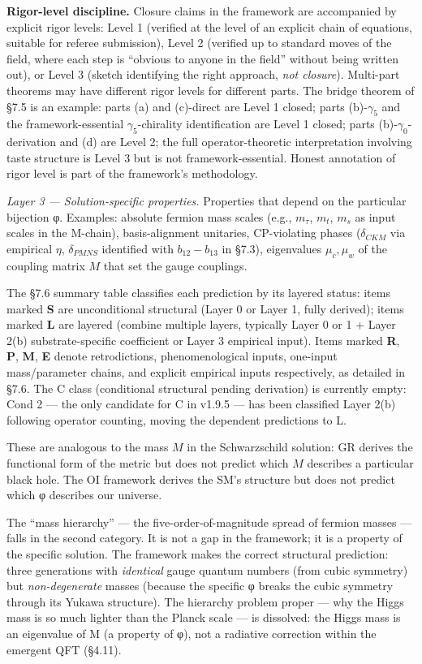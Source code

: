 \documentclass[
]{article}
\begin{document}
\textbf{Rigor-level discipline.} Closure claims in the framework are
accompanied by explicit rigor levels: Level 1 (verified at the level of
an explicit chain of equations, suitable for referee submission), Level
2 (verified up to standard moves of the field, where each step is
``obvious to anyone in the field'' without being written out), or Level
3 (sketch identifying the right approach, \emph{not closure}).
Multi-part theorems may have different rigor levels for different parts.
The bridge theorem of §7.5 is an example: parts (a) and (c)-direct are
Level 1 closed; parts (b)-\(\gamma_5\) and the framework-essential
\(\gamma_5\)-chirality identification are Level 1 closed; parts
(b)-\(\gamma_0\)-derivation and (d) are Level 2; the full
operator-theoretic interpretation involving taste structure is Level 3
but is not framework-essential. Honest annotation of rigor level is part
of the framework's methodology.

\emph{Layer 3 --- Solution-specific properties.} Properties that depend
on the particular bijection φ. Examples: absolute fermion mass scales
(e.g., \(m_\tau\), \(m_t\), \(m_s\) as input scales in the M-chain),
basis-alignment unitaries, CP-violating phases (\(\delta_{CKM}\) via
empirical \(\eta\), \(\delta_{PMNS}\) identified with
\(b_{12} - b_{13}\) in §7.3), eigenvalues \(\mu_c, \mu_w\) of the
coupling matrix \(M\) that set the gauge couplings.

The §7.6 summary table classifies each prediction by its layered status:
items marked \textbf{S} are unconditional structural (Layer 0 or Layer
1, fully derived); items marked \textbf{L} are layered (combine multiple
layers, typically Layer 0 or 1 + Layer 2(b) substrate-specific
coefficient or Layer 3 empirical input). Items marked \textbf{R},
\textbf{P}, \textbf{M}, \textbf{E} denote retrodictions,
phenomenological inputs, one-input mass/parameter chains, and explicit
empirical inputs respectively, as detailed in §7.6. The C class
(conditional structural pending derivation) is currently empty: Cond 2
--- the only candidate for C in v1.9.5 --- has been classified Layer
2(b) following operator counting, moving the dependent predictions to L.

These are analogous to the mass \(M\) in the Schwarzschild solution: GR
derives the functional form of the metric but does not predict which
\(M\) describes a particular black hole. The OI framework derives the
SM's structure but does not predict which φ describes our universe.

The ``mass hierarchy'' --- the five-order-of-magnitude spread of fermion
masses --- falls in the second category. It is not a gap in the
framework; it is a property of the specific solution. The framework
makes the correct structural prediction: three generations with
\emph{identical} gauge quantum numbers (from cubic symmetry) but
\emph{non-degenerate} masses (because the specific φ breaks the cubic
symmetry through its Yukawa structure). The hierarchy problem proper ---
why the Higgs mass is so much lighter than the Planck scale --- is
dissolved: the Higgs mass is an eigenvalue of M (a property of φ), not a
radiative correction within the emergent QFT (§4.11).
\end{document}
